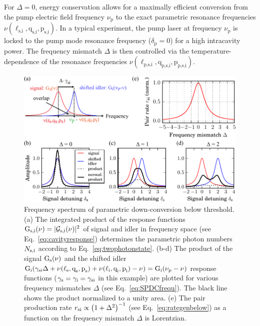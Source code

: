 \documentclass[aps,pra,showpacs,reprint,onecolumn,notitlepage]{revtex4-1}
\newcommand{\tx}[1]{\textnormal{#1}}
\begin{document}
For $\Delta=0$, energy conservation allows for a maximally efficient conversion from the pump electric field frequency $\nu_\textrm{p}$ to the exact parametric resonance frequencies $\nu (\ell_\textrm{s,i},\textrm{q}_\textrm{s,i},\textrm{p}_\textrm{s,i})$. In a typical experiment, the pump laser at frequency $\nu_\textrm{p}$ is locked to the pump mode resonance frequency  ($\delta_\textrm{p}=0$) for a high intracavity power. The frequency mismatch $\Delta$ is then controlled via the temperature-dependence of the resonance frequencies $\nu (\ell_\textrm{p,s,i},\textrm{q}_\textrm{p,s,i},\textrm{p}_\textrm{p,s,i})$.
\begin{figure}[htb]
	\centering
	\includegraphics[scale=0.8]{pictures/teo_SPDC_spectrum/SPDC_spectrum_1.pdf}
	\caption{Frequency spectrum of parametric down-conversion below threshold. (a) The integrated product of the response functions $\tx{G}_\tx{s,i}(\nu) = |\mathcal{G}_\tx{s,i}(\nu)|^2$ of signal and idler in frequency space (see Eq.~\ref{eq:cavityresponse}) determines the parametric photon numbers $N_\tx{s,i}$ according to Eq.~\ref{eq:twophotonstate}. (b-d) The product of the signal $\tx{G}_\tx{s}(\nu)$ and the shifted idler $\tx{G}_\tx{i}(\gamma_\tx{si}\Delta + \nu (\ell_\textrm{s},\textrm{q}_\textrm{s},\textrm{p}_\textrm{s} ) +\nu (\ell_\textrm{i},\textrm{q}_\textrm{i},\textrm{p}_\textrm{i} ) -\nu) = \tx{G}_\tx{i}(\nu_\tx{p}-\nu)$ response functions ($\gamma_\tx{s}=\gamma_\tx{i} = \gamma_\tx{si}$ in this example) are plotted for various frequency mismatches $\Delta$ (see Eq.~\ref{eq:SPDCfrequ}). The black line shows the product normalized to a unity area. (e) The pair production rate ${r_\tx{si} \propto \left( 1+\Delta^2 \right)^{-1}}$ (see Eq.~\ref{eq:rategenbelow}) as a function on the frequency mismatch $\Delta$  is Lorentzian.} 
	\label{fig:spdc_spectrum}
\end{figure}
\end{document}
